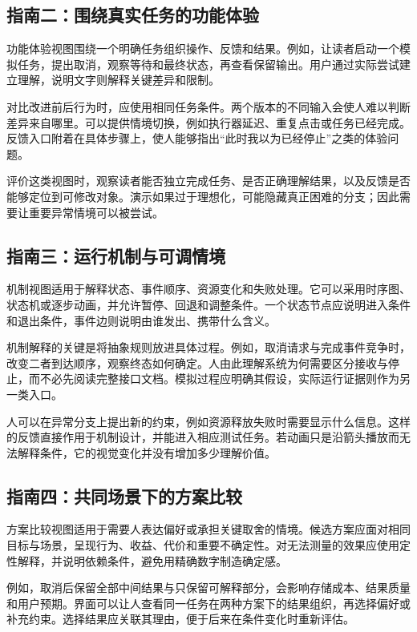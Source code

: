 \subsection{指南二：围绕真实任务的功能体验}
功能体验视图围绕一个明确任务组织操作、反馈和结果。例如，让读者启动一个模拟任务，提出取消，观察等待和最终状态，再查看保留输出。用户通过实际尝试建立理解，说明文字则解释关键差异和限制。

对比改进前后行为时，应使用相同任务条件。两个版本的不同输入会使人难以判断差异来自哪里。可以提供情境切换，例如执行器延迟、重复点击或任务已经完成。反馈入口附着在具体步骤上，使人能够指出“此时我以为已经停止”之类的体验问题。


评价这类视图时，观察读者能否独立完成任务、是否正确理解结果，以及反馈是否能够定位到可修改对象。演示如果过于理想化，可能隐藏真正困难的分支；因此需要让重要异常情境可以被尝试。

\subsection{指南三：运行机制与可调情境}
机制视图适用于解释状态、事件顺序、资源变化和失败处理。它可以采用时序图、状态机或逐步动画，并允许暂停、回退和调整条件。一个状态节点应说明进入条件和退出条件，事件边则说明由谁发出、携带什么含义。

机制解释的关键是将抽象规则放进具体过程。例如，取消请求与完成事件竞争时，改变二者到达顺序，观察终态如何确定。人由此理解系统为何需要区分接收与停止，而不必先阅读完整接口文档。模拟过程应明确其假设，实际运行证据则作为另一类入口。

人可以在异常分支上提出新的约束，例如资源释放失败时需要显示什么信息。这样的反馈直接作用于机制设计，并能进入相应测试任务。若动画只是沿箭头播放而无法解释条件，它的视觉变化并没有增加多少理解价值。

\subsection{指南四：共同场景下的方案比较}
方案比较视图适用于需要人表达偏好或承担关键取舍的情境。候选方案应面对相同目标与场景，呈现行为、收益、代价和重要不确定性。对无法测量的效果应使用定性解释，并说明依赖条件，避免用精确数字制造确定感。

例如，取消后保留全部中间结果与只保留可解释部分，会影响存储成本、结果质量和用户预期。界面可以让人查看同一任务在两种方案下的结果组织，再选择偏好或补充约束。选择结果应关联其理由，便于后来在条件变化时重新评估。

